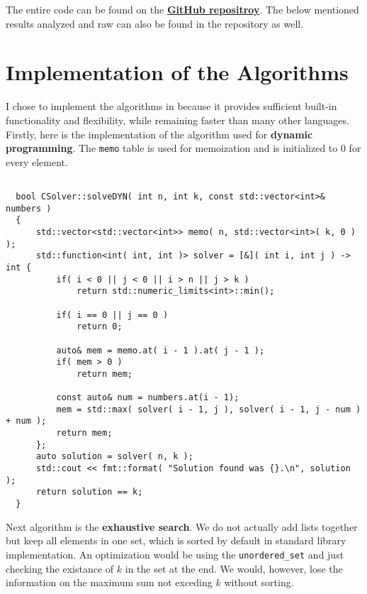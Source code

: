\documentclass[11pt]{article}
\begin{document}
\maketitle

The entire code can be found on the \href{https://github.com/Edelwy/approximation-algorithms}{\textbf{GitHub repositroy}}. The below mentioned results analyzed and raw can also be found in the repository as well.

\section{Implementation of the Algorithms}

I chose to implement the algorithms in \cpp because it provides sufficient built-in functionality and flexibility, while remaining faster than many other languages. Firstly, here is the implementation of the algorithm used for \textbf{dynamic programming}. The \texttt{memo} table is used for memoization and is initialized to $0$ for every element.

\begin{verbatim}

  bool CSolver::solveDYN( int n, int k, const std::vector<int>& numbers )
  {
      std::vector<std::vector<int>> memo( n, std::vector<int>( k, 0 ) );
      std::function<int( int, int )> solver = [&]( int i, int j ) -> int {
          if( i < 0 || j < 0 || i > n || j > k )
              return std::numeric_limits<int>::min();
  
          if( i == 0 || j == 0 )
              return 0;
  
          auto& mem = memo.at( i - 1 ).at( j - 1 );
          if( mem > 0 ) 
              return mem;
  
          const auto& num = numbers.at(i - 1);
          mem = std::max( solver( i - 1, j ), solver( i - 1, j - num ) + num );
          return mem;
      };
      auto solution = solver( n, k );
      std::cout << fmt::format( "Solution found was {}.\n", solution );
      return solution == k;
  }
\end{verbatim}

Next algorithm is the \textbf{exhaustive search}. We do not actually add lists together but keep all elements in one set, which is sorted by default in \cpp standard library implementation. An optimization would be using the \texttt{unordered\_set} and just checking the existance of $k$ in the set at the end. We would, however, lose the information on the maximum sum not exceding $k$ without sorting.
\end{document}
